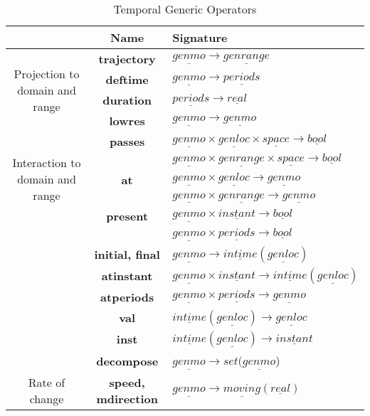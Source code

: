 \begin{table}[ht]
 \begin{center} 
  \begin{tabular}{c|c|l}
	\hline
    &Name & Signature \\
	\hline
	\multirow{4}{*}{Projection to domain and range}&\textbf{trajectory}&$\underline{genmo} \rightarrow {\underline{genrange}}$ \\
	&\textbf{deftime} &$ \underline{genmo} \rightarrow \underline{periods}$ \\
    &\textbf{duration} &$ \underline{periods} \rightarrow \underline{real}$ \\
    &\textbf{lowres} &$\underline{genmo} \rightarrow \underline{genmo}$ \\
	\hline
	\multirow{5}{*}{Interaction to domain and range}&\textbf{passes}&
	$\underline{genmo} \times \underline{genloc} \times \underline{space} \rightarrow {\underline{bool}}$\\
	& &$\underline{genmo} \times \underline{genrange} \times \underline{space} \rightarrow {\underline{bool}}$\\
	&\textbf{at} &$\underline{genmo} \times \underline{genloc} \rightarrow {\underline{genmo}}$\\
    & &$\underline{genmo} \times \underline{genrange} \rightarrow {\underline{genmo}}$\\
	&\textbf{present}&$\underline{genmo} \times \underline{instant} \rightarrow {\underline{bool}}$ \\
    & &$\underline{genmo} \times \underline{periods} \rightarrow {\underline{bool}}$ \\
	&\textbf{initial, final} &$\underline{genmo} \rightarrow {\underline{intime}}({\underline{genloc}})$ \\
	&\textbf{atinstant} &$\underline{genmo} \times \underline{instant} \rightarrow {\underline{intime}}({\underline{genloc}})$ \\
	&\textbf{atperiods} &$\underline{genmo} \times \underline{periods} \rightarrow {\underline{genmo}}$ \\
    &\textbf{val} &${\underline{intime}}({\underline{genloc}}) \rightarrow \underline{genloc}$ \\
    &\textbf{inst} &${\underline{intime}}({\underline{genloc}}) \rightarrow \underline{instant}$ \\
    &\textbf{decompose} &$\underline{genmo} \rightarrow set(\underline{genmo}$) \\                
	\hline
	\multirow{1}{*}{Rate of change}&\textbf{speed, mdirection} &$\underline{genmo} \rightarrow {\underline{moving}(\underline{real})}$\\
	\hline
  \end{tabular}
 \end{center}
 \caption{\label{tab:operators2}Temporal Generic Operators }
\end{table}

